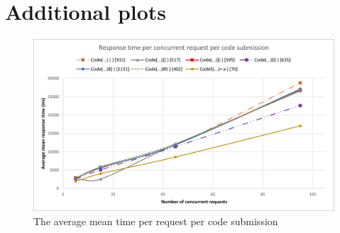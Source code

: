 \chapter{Additional plots} \label{chap:AdditionalPlots}
\begin{figure}
    \centering
    \includegraphics[]{images/Aveage per code.png}
    \caption{The average mean time per request per code submission}
    \label{fig:averagePerCode}
\end{figure}